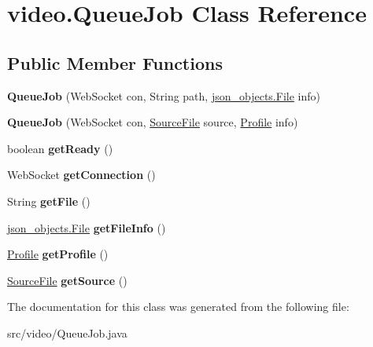 \hypertarget{classvideo_1_1_queue_job}{
\section{video.QueueJob Class Reference}
\label{classvideo_1_1_queue_job}
}
\subsection*{Public Member Functions}
\begin{DoxyCompactItemize}
\item 
\hypertarget{classvideo_1_1_queue_job_aa4dfa09d7639e24664c725996d447c2d}{
{\bfseries QueueJob} (WebSocket con, String path, \hyperlink{classjson__objects_1_1_file}{json\_\-objects.File} info)}
\label{classvideo_1_1_queue_job_aa4dfa09d7639e24664c725996d447c2d}

\item 
\hypertarget{classvideo_1_1_queue_job_af11e436e3eb591df65f89f43e166ff16}{
{\bfseries QueueJob} (WebSocket con, \hyperlink{classvideo_1_1_source_file}{SourceFile} source, \hyperlink{classvideo_1_1_profile}{Profile} info)}
\label{classvideo_1_1_queue_job_af11e436e3eb591df65f89f43e166ff16}

\item 
\hypertarget{classvideo_1_1_queue_job_a5ba42ae0f6ccae08602173cfef765990}{
boolean {\bfseries getReady} ()}
\label{classvideo_1_1_queue_job_a5ba42ae0f6ccae08602173cfef765990}

\item 
\hypertarget{classvideo_1_1_queue_job_a58d0b83a199efb83e4f0aee386554ee6}{
WebSocket {\bfseries getConnection} ()}
\label{classvideo_1_1_queue_job_a58d0b83a199efb83e4f0aee386554ee6}

\item 
\hypertarget{classvideo_1_1_queue_job_a1ea929588a9155cdf4a90393ebf24749}{
String {\bfseries getFile} ()}
\label{classvideo_1_1_queue_job_a1ea929588a9155cdf4a90393ebf24749}

\item 
\hypertarget{classvideo_1_1_queue_job_a533d604a38d42bc639f8bebb076cbad4}{
\hyperlink{classjson__objects_1_1_file}{json\_\-objects.File} {\bfseries getFileInfo} ()}
\label{classvideo_1_1_queue_job_a533d604a38d42bc639f8bebb076cbad4}

\item 
\hypertarget{classvideo_1_1_queue_job_ad2722417e2cdbbf1cd70d2687966e285}{
\hyperlink{classvideo_1_1_profile}{Profile} {\bfseries getProfile} ()}
\label{classvideo_1_1_queue_job_ad2722417e2cdbbf1cd70d2687966e285}

\item 
\hypertarget{classvideo_1_1_queue_job_a8682346812773e5ec825d9016c5b2ff8}{
\hyperlink{classvideo_1_1_source_file}{SourceFile} {\bfseries getSource} ()}
\label{classvideo_1_1_queue_job_a8682346812773e5ec825d9016c5b2ff8}

\end{DoxyCompactItemize}


The documentation for this class was generated from the following file:\begin{DoxyCompactItemize}
\item 
src/video/QueueJob.java\end{DoxyCompactItemize}
